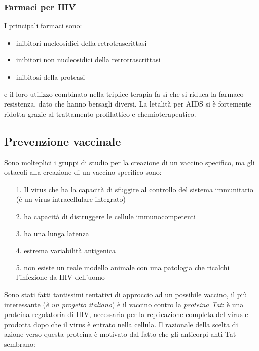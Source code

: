 \subsubsection{Farmaci per HIV}

I principali farmaci sono:

\begin{itemize}
\item
  inibitori nucleosidici della retrotrascrittasi
\item
  inibitori non nucleosidici della retrotrascrittasi
\item
  inibitosi della proteasi
\end{itemize}

e il loro utilizzo combinato nella triplice terapia fa sì che si riduca
la farmaco resistenza, dato che hanno bersagli diversi. La letalità per
AIDS si è fortemente ridotta grazie al trattamento profilattico e
chemioterapeutico.

\subsection{Prevenzione vaccinale}

Sono molteplici i gruppi di studio per la creazione di un vaccino
specifico, ma gli ostacoli alla creazione di un vaccino specifico sono:

\begin{itemize}
\item[1.]
  Il virus che ha la capacità di sfuggire al controllo del sistema
  immunitario (è un virus intracellulare integrato)
\item[2.]
  ha capacità di distruggere le cellule immunocompetenti
\item[3.]
  ha una lunga latenza
\item[4.]
  estrema variabilità antigenica
\item[5.]
  non esiste un reale modello animale con una patologia che ricalchi
  l'infezione da HIV dell'uomo
\end{itemize}

Sono stati fatti tantissimi tentativi di approccio ad un possibile
vaccino, il più interessante (\emph{è un progetto italiano}) è il
vaccino contro la \emph{proteina Tat}: è una proteina regolatoria di
HIV, necessaria per la replicazione completa del virus e prodotta dopo
che il virus è entrato nella cellula. Il razionale della scelta di
azione verso questa proteina è motivato dal fatto che gli anticorpi anti
Tat sembrano:

